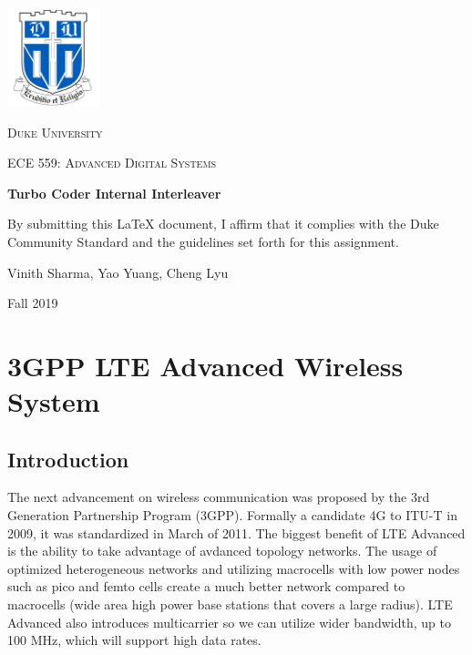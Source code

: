 \documentclass[letterpaper, 12pt]{article} %
\begin{document}
\begin{titlepage}
	\centering
	\includegraphics[width=0.2\textwidth]{files/Duke_logo.png}\par\vspace{1cm}
	{\scshape\LARGE Duke University \par}
	\vspace{1cm}
	{\scshape\Large ECE 559: Advanced Digital Systems \par}
	\vspace{1.5cm}
	{\huge\bfseries Turbo Coder Internal Interleaver \par}
	\vspace{2cm}
   {By submitting this \LaTeX{} document, I affirm that it complies with the Duke Community Standard and the guidelines set forth for this assignment.\par}
   \vspace{1cm}
	{\Large Vinith Sharma, Yao Yuang, Cheng Lyu}
	\vfill
	{\large Fall 2019\par}
\end{titlepage}

\newpage 
\section{3GPP LTE Advanced Wireless System}
    \subsection{Introduction}
        The next advancement on wireless communication was proposed by the 3rd Generation Partnership Program (3GPP). Formally a candidate 4G to ITU-T in 2009, it was standardized in March of 2011.
        The biggest benefit of LTE Advanced is the ability to take advantage of avdanced topology networks. The usage of optimized heterogeneous networks and utilizing macrocells with low power nodes such as pico and femto cells create a much better network compared to macrocells (wide area high power base stations that covers a large radius). LTE Advanced also introduces multicarrier so we can utilize wider bandwidth, up to 100 MHz, which will support high data rates.
        
\end{document}
